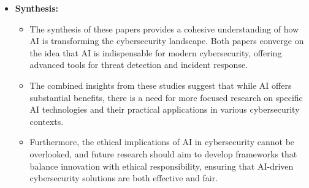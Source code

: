 \documentclass{article}  %
\begin{document}
\begin{itemize}
    \item \textbf{Synthesis:}
    \begin{itemize}
        \item The synthesis of these papers provides a cohesive understanding of how AI is transforming the cybersecurity landscape. Both papers converge on the idea that AI is indispensable for modern cybersecurity, offering advanced tools for threat detection and incident response.
        \item The combined insights from these studies suggest that while AI offers substantial benefits, there is a need for more focused research on specific AI technologies and their practical applications in various cybersecurity contexts.
        \item Furthermore, the ethical implications of AI in cybersecurity cannot be overlooked, and future research should aim to develop frameworks that balance innovation with ethical responsibility, ensuring that AI-driven cybersecurity solutions are both effective and fair.
    \end{itemize}
\end{itemize}
\end{document}
